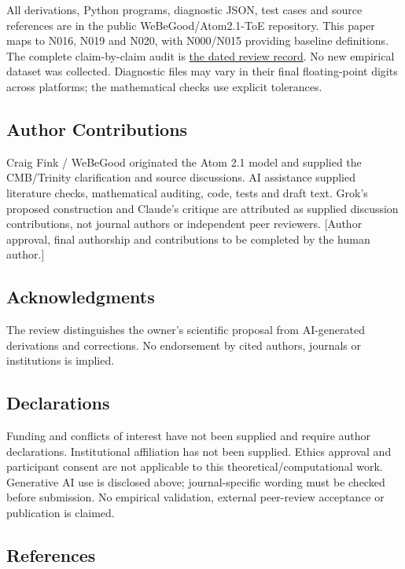 \documentclass[
  11pt,
]{article}
\begin{document}
All derivations, Python programs, diagnostic JSON, test cases and source
references are in the public WeBeGood/Atom2.1-ToE repository. This paper
maps to N016, N019 and N020, with N000/N015 providing baseline
definitions. The complete claim-by-claim audit is
\href{../../notes/2026-09-14_grok_claude_peer_review.md}{the dated
review record}. No new empirical dataset was collected. Diagnostic files
may vary in their final floating-point digits across platforms; the
mathematical checks use explicit tolerances.

\hypertarget{author-contributions}{%
\subsection{Author Contributions}\label{author-contributions}}

Craig Fink / WeBeGood originated the Atom 2.1 model and supplied the
CMB/Trinity clarification and source discussions. AI assistance supplied
literature checks, mathematical auditing, code, tests and draft text.
Grok's proposed construction and Claude's critique are attributed as
supplied discussion contributions, not journal authors or independent
peer reviewers. {[}Author approval, final authorship and contributions
to be completed by the human author.{]}

\hypertarget{acknowledgments}{%
\subsection{Acknowledgments}\label{acknowledgments}}

The review distinguishes the owner's scientific proposal from
AI-generated derivations and corrections. No endorsement by cited
authors, journals or institutions is implied.

\hypertarget{declarations}{%
\subsection{Declarations}\label{declarations}}

Funding and conflicts of interest have not been supplied and require
author declarations. Institutional affiliation has not been supplied.
Ethics approval and participant consent are not applicable to this
theoretical/computational work. Generative AI use is disclosed above;
journal-specific wording must be checked before submission. No empirical
validation, external peer-review acceptance or publication is claimed.

\hypertarget{references}{%
\subsection{References}\label{references}}
\end{document}
